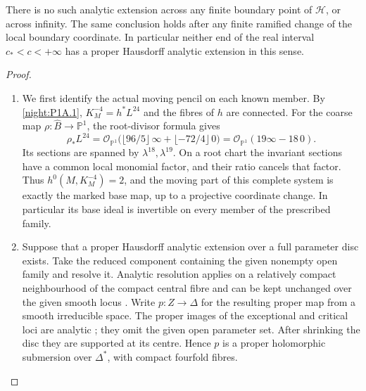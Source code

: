 \begin{theorem}\label{night:P1A.5}
There is no such analytic extension across any finite boundary
point of $\mathcal H$, or across infinity. The same conclusion
holds after any finite ramified change of the local boundary
coordinate. In particular neither end of the real interval
$c_*<c<+\infty$ has a proper Hausdorff analytic extension in
this sense.
\end{theorem}
\begin{proof}
\begin{enumerate}[label=\arabic*.]
\item We first identify the actual moving pencil on each known member.
By \cref{night:P1A.1}, $K_M^{-4}=h^*L^{24}$ and the fibres of $h$
are connected.  For the coarse map
$\rho:\widehat B\to\mathbb P^1$, the root-divisor formula gives
\[
 \rho_*L^{24}
 =\mathcal O_{\mathbb P^1}
   \bigl(\lfloor96/5\rfloor\,\infty+
                \lfloor-72/4\rfloor\,0\bigr)
 =\mathcal O_{\mathbb P^1}(19\infty-18\,0).
\]
Its sections are spanned by $\lambda^{18},\lambda^{19}$.
On a root chart the invariant sections have a common local
monomial factor, and their ratio cancels that factor.  Thus
$h^0(M,K_M^{-4})=2$, and the moving part of this complete
system is exactly the marked base map, up to a projective
coordinate change.  In particular its base ideal is invertible
on every member of the prescribed family.

\item Suppose that a proper Hausdorff analytic extension over a full
parameter disc exists.  Take the reduced component containing
the given nonempty open family and resolve it.  Analytic
resolution applies on a relatively compact neighbourhood of
the compact central fibre and can be kept unchanged over the
given smooth locus
\cite[Theorem 1.6 and its following analytic-neighbourhood
paragraph, preprint p.~5]{BM97}.
Write $p:Z\to\Delta$ for the resulting proper map from a smooth
irreducible space.  The proper images of the exceptional and
critical loci are analytic
\cite[\S7, Satz 1, p.~60]{Grauert60}; they omit the given open
parameter set.  After shrinking the disc they are supported
at its centre.  Hence $p$ is a proper holomorphic submersion
over $\Delta^*$, with compact fourfold fibres.


\end{enumerate}
\end{proof}
